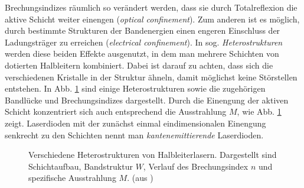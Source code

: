 Brechungsindizes räumlich so verändert werden, dass sie durch Totalreflexion die
aktive Schicht weiter einengen (\textit{optical confinement}). Zum anderen ist
es möglich, durch bestimmte Strukturen der Bandenergien einen engeren Einschluss
der Ladungsträger zu erreichen (\textit{electrical confinement}). In sog.
\textit{Heterostrukturen} werden diese beiden Effekte ausgenutzt, in dem man
mehrere Schichten von dotierten Halbleitern kombiniert. Dabei ist darauf zu
achten, dass sich die verschiedenen Kristalle in der Struktur ähneln, damit
möglichst keine Störstellen entstehen. In Abb. \ref{fig:heterostrukturen} sind
einige Heterostrukturen sowie die zugehörigen Bandlücke und Brechungsindizes
dargestellt. Durch die Einengung der aktiven Schicht konzentriert sich auch
entsprechend die Ausstrahlung $M$, wie Abb. \ref{fig:heterostrukturen} zeigt.
Laserdioden mit der zunächst einmal eindimensionalen Einengung senkrecht zu den Schichten nennt man \textit{kantenemittierende} Laserdioden.
\begin{figure}[h]
	\centering
	\caption[Heterostrukturen]{Verschiedene Heterostrukturen von
	Halbleiterlasern. Dargestellt sind Schichtaufbau,
	Bandstruktur $W$, Verlauf des Brechungsindex $n$ 
	und spezifische Ausstrahlung $M$. (aus
	\cite{schumann:2001:diplomarbeit})}
	\label{fig:heterostrukturen}
\end{figure}

